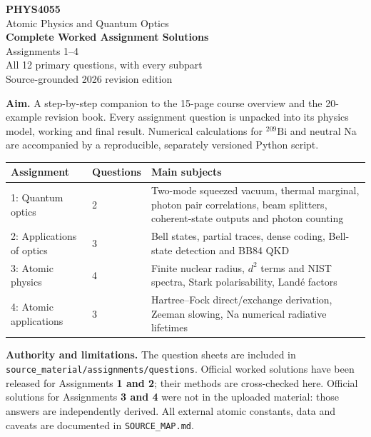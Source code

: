 \documentclass[10pt,a4paper]{article}
\begin{document}
\begin{center}
\vspace*{7mm}
{\color{accent}\Huge\bfseries PHYS4055}\\[3mm]
{\LARGE Atomic Physics and Quantum Optics}\\[7mm]
{\Large\bfseries Complete Worked Assignment Solutions}\\[3mm]
{\Large Assignments 1--4}\\[5mm]
{\normalsize All 12 primary questions, with every subpart}\\[3mm]
{\normalsize Source-grounded 2026 revision edition}
\end{center}
\vspace{8mm}
\begin{methodbox}
\textbf{Aim.} A step-by-step companion to the
15-page course overview and the 20-example revision book.
Every assignment question is unpacked into its physics model,
working and final result. Numerical calculations for
\(^{209}\mathrm{Bi}\) and neutral Na are accompanied by a
reproducible, separately versioned Python script.
\end{methodbox}

\begin{center}
\begin{tabularx}{\linewidth}{@{}p{31mm}p{22mm}X@{}}
\toprule
\textbf{Assignment}&\textbf{Questions}&\textbf{Main subjects}\\\midrule
1: Quantum optics&2&
Two-mode squeezed vacuum, thermal marginal,
photon pair correlations, beam splitters,
coherent-state outputs and photon counting\\
2: Applications of optics&3&
Bell states, partial traces, dense coding,
Bell-state detection and BB84 QKD\\
3: Atomic physics&4&
Finite nuclear radius, \(d^2\) terms and NIST
spectra, Stark polarisability, Land\'e factors\\
4: Atomic applications&3&
Hartree--Fock direct/exchange derivation,
Zeeman slowing, Na numerical radiative lifetimes\\
\bottomrule
\end{tabularx}
\end{center}
\bigskip
\begin{cautionbox}
\textbf{Authority and limitations.}
The question sheets are included in
\texttt{source\_material/assignments/questions}.
Official worked solutions have been released
for Assignments \textbf{1 and 2}; their methods
are cross-checked here. Official solutions for
Assignments \textbf{3 and 4} were not in the uploaded
material: those answers are independently derived.
All external atomic constants, data and caveats
are documented in \texttt{SOURCE\_MAP.md}.
\end{cautionbox}
\vfill
{}
\clearpage
\tableofcontents
\end{document}
